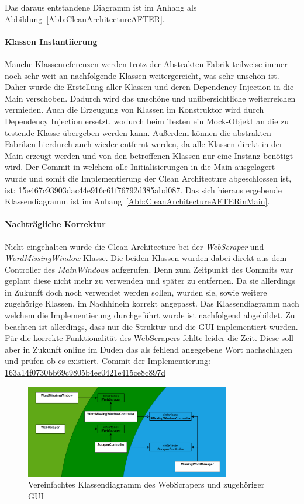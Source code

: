Das daraus entstandene Diagramm ist im Anhang als Abbildung~\ref{Abb:CleanArchitectureAFTER}.


\paragraph{Klassen Instantiierung}
Manche Klassenreferenzen werden trotz der Abstrakten Fabrik teilweise immer noch sehr weit an nachfolgende Klassen \glqq weitergereicht\grqq, was sehr unschön ist. Daher wurde die Erstellung aller Klassen und deren Dependency Injection in die Main verschoben. Dadurch wird das unschöne und unübersichtliche weiterreichen vermieden. Auch die Erzeugung von Klassen im Konstruktor wird durch Dependency Injection ersetzt, wodurch beim Testen ein Mock-Objekt an die zu testende Klasse übergeben werden kann. Außerdem können die abstrakten Fabriken hierdurch auch wieder entfernt werden, da alle Klassen direkt in der Main erzeugt werden und von den betroffenen Klassen nur eine Instanz benötigt wird. Der Commit in welchem alle Initialisierungen in die Main ausgelagert wurde und somit die Implementierung der Clean Architecture abgeschlossen ist, ist: \href{https://github.com/EinToni/Wortfinder/commit/15e467c93903dac44e916c61f76792d385abd087}{15e467c93903dac44e916c61f76792d385abd087}. Das sich hieraus ergebende Klassendiagramm ist im Anhang~\ref{Abb:CleanArchitectureAFTERinMain}.


\paragraph{Nachträgliche Korrektur}
Nicht eingehalten wurde die Clean Architecture bei der \textit{WebScraper} und \textit{WordMissingWindow} Klasse. Die beiden Klassen wurden dabei direkt aus dem Controller des \textit{MainWindow}s aufgerufen. Denn zum Zeitpunkt des Commits war geplant diese nicht mehr zu verwenden und später zu entfernen. Da sie allerdings in Zukunft doch noch verwendet werden sollen, wurden sie, sowie weitere zugehörige Klassen, im Nachhinein korrekt angepasst. Das Klassendiagramm nach welchem die Implementierung durchgeführt wurde ist nachfolgend abgebildet. Zu beachten ist allerdings, dass nur die Struktur und die GUI implementiert wurden. Für die korrekte Funktionalität des WebScrapers fehlte leider die Zeit. Diese soll aber in Zukunft online im Duden das als fehlend angegebene Wort nachschlagen und prüfen ob es existiert. Commit der Implementierung: \href{https://github.com/EinToni/Wortfinder/commit/163a14f0730bb69c9805b4ee0421e415ce8c897d}{163a14f0730bb69c9805b4ee0421e415ce8c897d}

\begin{figure}[htb]
\centering
\includegraphics[width=0.8\textwidth]{Bilder/CleanArchitectureWebScraper.PNG}
\caption{\label{Abb:CleanArchitectureWebScraper}Vereinfachtes Klassendiagramm des WebScrapers und zugehöriger GUI}
\end{figure}

\endinput